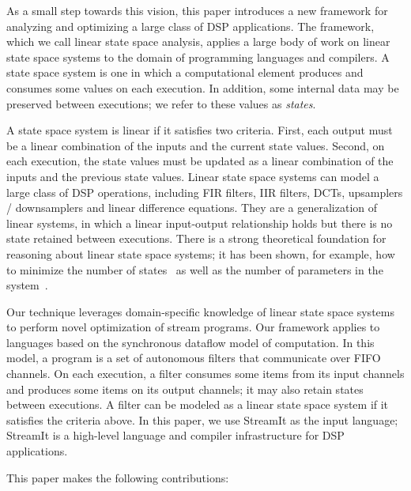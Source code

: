As a small step towards this vision, this paper introduces a new
framework for analyzing and optimizing a large class of DSP
applications.  The framework, which we call linear state space
analysis, applies a large body of work on linear state space systems
to the domain of programming languages and compilers.  A state space
system is one in which a computational element produces and consumes
some values on each execution.  In addition, some internal data may be
preserved between executions; we refer to these values as {\it
states}.

A state space system is linear if it satisfies two criteria.  First,
each output must be a linear combination of the inputs and the current
state values.  Second, on each execution, the state values must be
updated as a linear combination of the inputs and the previous state
values.  Linear state space systems can model a large class of DSP
operations, including FIR filters, IIR filters, DCTs, upsamplers /
downsamplers and linear difference equations.  They are a
generalization of linear systems, in which a linear input-output
relationship holds but there is no state retained between executions.
There is a strong theoretical foundation for reasoning about linear
state space systems; it has been shown, for example, how to minimize
the number of states~\cite{Moore} as well as the number of parameters
in the system~\cite{Ackermann/Bucy,Mayne,Schutter}.

Our technique leverages domain-specific knowledge of linear state
space systems to perform novel optimization of stream programs.  Our
framework applies to languages based on the synchronous dataflow model
of computation.  In this model, a program is a set of autonomous
filters that communicate over FIFO channels.  On each execution, a
filter consumes some items from its input channels and produces some
items on its output channels; it may also retain states between
executions.  A filter can be modeled as a linear state space system if
it satisfies the criteria above.  In this paper, we use StreamIt as
the input language; StreamIt is a high-level language and compiler
infrastructure for DSP applications.

This paper makes the following contributions:

